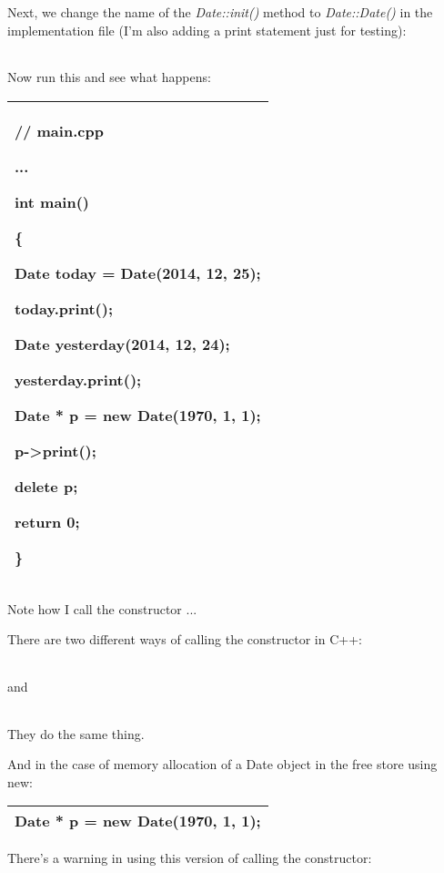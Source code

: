 \documentclass[
]{article}
\begin{document}
Next, we change the name of the \emph{Date::init()} method to
\emph{Date::Date() }in the implementation file (I'm also adding a print
statement just for testing):

\begin{longtable}[]{@{}@{}}
\toprule
\endhead
\bottomrule
\end{longtable}

Now run this and see what happens:

\begin{longtable}[]{@{}l@{}}
\toprule
\endhead
\begin{minipage}[t]{0.97\columnwidth}\raggedright
// main.cpp

...

int main()

\{

Date today = Date(2014, 12, 25);

today.print();

Date yesterday(2014, 12, 24);

yesterday.print();

Date * p = new Date(1970, 1, 1);

p-\textgreater print();

delete p;

return 0;

\}\strut
\end{minipage}\tabularnewline
\bottomrule
\end{longtable}

Note how I call the constructor ...

There are two different ways of calling the constructor in C++:

\begin{longtable}[]{@{}@{}}
\toprule
\endhead
\bottomrule
\end{longtable}

and

\begin{longtable}[]{@{}@{}}
\toprule
\endhead
\bottomrule
\end{longtable}

They do the same thing.

And in the case of memory allocation of a Date object in the free store
using new:

\begin{longtable}[]{@{}l@{}}
\toprule
\endhead
Date * p = new Date(1970, 1, 1);\tabularnewline
\bottomrule
\end{longtable}

There's a warning in using this version of calling the constructor:
\end{document}
